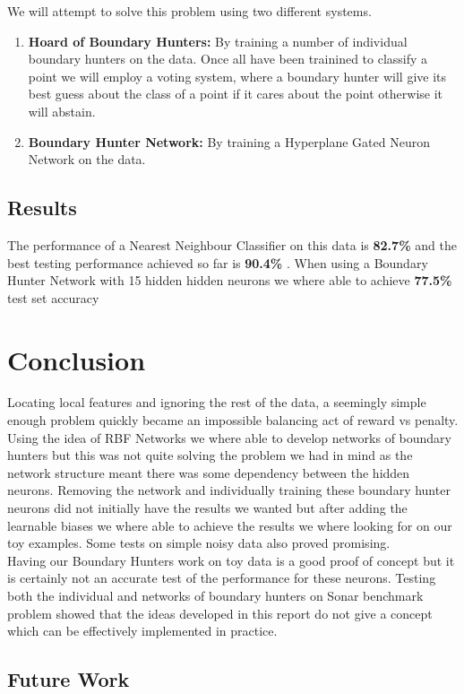 \documentclass[notitlepage]{report}
\theoremstyle{definition}
\begin{document}
We will attempt to solve this problem using two different systems.

\begin{enumerate}
\item \textbf{Hoard of Boundary Hunters:} By training a number of individual boundary hunters on the data. Once all have been trainined to classify a point we will employ a voting system, where a boundary hunter will give its best guess about the class of a point if it cares about the point otherwise it will abstain.

\item \textbf{Boundary Hunter Network:} By training a Hyperplane Gated Neuron Network on the data.
\end{enumerate}

\section{Results}
The performance of a Nearest Neighbour Classifier on this data is \textbf{82.7\%} and the best testing performance achieved so far is \textbf{90.4\%} \cite{gorman1988analysis}. When using a Boundary Hunter Network with 15 hidden hidden neurons we where able to achieve \textbf{77.5\%} test set accuracy


\chapter{Conclusion}
Locating local features and ignoring the rest of the data, a seemingly simple enough problem quickly became an impossible balancing act of reward vs penalty. Using the idea of RBF Networks we where able to develop networks of boundary hunters but this was not quite solving the problem we had in mind as the network structure meant there was some dependency between the hidden neurons. Removing the network and individually training these boundary hunter neurons did not initially have the results we wanted but after adding the learnable biases we where able to achieve the results we where looking for on our toy examples. Some tests on simple noisy data also proved promising.\\

Having our Boundary Hunters work on toy data is a good proof of concept but it is certainly not an accurate test of the performance for these neurons. Testing both the individual and networks of boundary hunters on Sonar benchmark problem showed that the ideas developed in this report do not give a concept which can be effectively implemented in practice.

\section{Future Work}

\newpage


\end{document}
